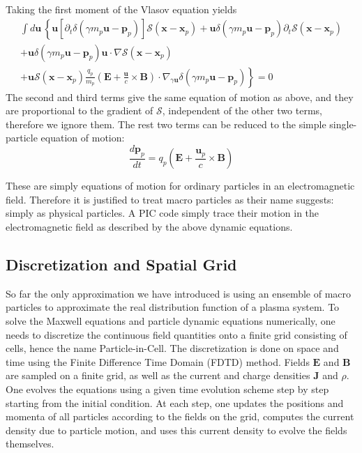 Taking the first moment of the Vlasov equation yields
\begin{equation}
\begin{split}
    \int d\mathbf{u}\,\left\{ \mathbf{u}\left[ \partial_t \delta(\gamma m_{p}\mathbf{u} - \mathbf{p}_p) \right]\mathcal{S}(\mathbf{x} - \mathbf{x}_p) + \mathbf{u}\delta(\gamma m_{p}\mathbf{u} - \mathbf{p}_p)\partial_t\mathcal{S}(\mathbf{x} - \mathbf{x}_p) \right. \\
    + \mathbf{u}\delta(\gamma m_{p}\mathbf{u} - \mathbf{p}_p) \mathbf{u}\cdot\nabla \mathcal{S}(\mathbf{x} - \mathbf{x}_p) \\
    \left. + \mathbf{u}\mathcal{S}(\mathbf{x} - \mathbf{x}_p)\frac{q_p}{m_p}\left(\mathbf{E} + \frac{\mathbf{u}}{c}\times \mathbf{B}\right)\cdot \nabla_{\gamma \mathbf{u}}\delta(\gamma m_{p}\mathbf{u} - \mathbf{p}_p) \right\} = 0
\end{split}
\end{equation}
The second and third terms give the same equation of motion as above, and they
are proportional to the gradient of $\mathcal{S}$, independent of the other two terms,
therefore we ignore them. The rest two terms can be reduced to the simple
single-particle equation of motion:
\begin{equation}
  \label{eq:eom-momentum}
\frac{d\mathbf{p}_p}{dt} = q_p\left(\mathbf{E} + \frac{\mathbf{u}_{p}}{c}\times \mathbf{B} \right)
\end{equation}

These are simply equations of motion for ordinary particles in an
electromagnetic field. Therefore it is justified to treat macro particles as
their name suggests: simply as physical particles. A PIC code simply trace their
motion in the electromagnetic field as described by the above dynamic equations.


\subsection{Discretization and Spatial Grid}
\label{sec:discretization}

So far the only approximation we have introduced is using an ensemble of macro
particles to approximate the real distribution function of a plasma system. To
solve the Maxwell equations and particle dynamic equations numerically, one
needs to discretize the continuous field quantities onto a finite grid
consisting of cells, hence the name Particle-in-Cell. The discretization is done
on space and time using the Finite Difference Time Domain (FDTD)
method. %
Fields $\mathbf{E}$ and $\mathbf{B}$ are sampled on a finite grid, as well as
the current and charge densities $\mathbf{J}$ and $\rho$. One evolves the
equations using a given time evolution scheme step by step starting from the
initial condition. At each step, one updates the positions and momenta of all
particles according to the fields on the grid, computes the current density due
to particle motion, and uses this current density to evolve the fields
themselves.

